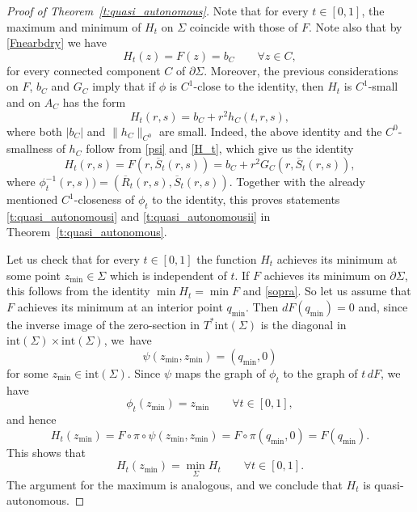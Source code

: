 \documentclass[10pt,a4paper]{article}
\theoremstyle{definition}
\begin{document}
\begin{proof}[Proof of Theorem~\ref{t:quasi_autonomous}]
Note that for every $t\in [0,1]$, the maximum and minimum of $H_t$ on $\Sigma$ coincide with those of $F$. Note also that by \eqref{Fnearbdry} we have
\begin{equation}
\label{sopra}
H_t(z) = F(z) = b_C \qquad \forall z\in C,
\end{equation}
for every connected component $C$ of $\partial \Sigma$. Moreover, the previous considerations on $F$, $b_C$ and $G_C$ imply that if $\phi$ is $C^1$-close to the identity, then $H_t$ is $C^1$-small and on $A_C$ has the form
\[
H_t(r,s) = b_C + r^2 h_C(t,r,s),
\]
where both $|b_C|$ and $\|h_C\|_{C^0}$ are small. Indeed, the above identity and the $C^0$-smallness of $h_C$ follow from \eqref{psi} and \eqref{H_t}, which give us the identity
\[
H_t(r,s) = F(r,\overline{S}_t(r,s)) = b_C + r^2 G_C(r,\overline{S}_t(r,s)),
\]
where $\phi_t^{-1}(r,s)) = ( \overline{R}_t(r,s),\overline{S}_t(r,s))$. Together with the already mentioned $C^1$\nobreakdash-close\-ness of $\phi_t$ to the identity, this proves statements \eqref{t:quasi_autonomousi} and \eqref{t:quasi_autonomousii} in Theorem~\ref{t:quasi_autonomous}.

Let us check that for every $t\in [0,1]$ the function $H_t$ achieves its minimum at some point $z_{\min}\in \Sigma$ which is independent of $t$. If $F$ achieves its minimum on $\partial \Sigma$, this follows from the identity $\min H_t = \min F$ and \eqref{sopra}. So let us assume that $F$ achieves its minimum at an interior point $q_{\min}$. Then $dF(q_{\min})=0$ and, since the inverse image of the zero-section in $T^* \mathrm{int}(\Sigma)$ is the diagonal in $\mathrm{int}(\Sigma) \times \mathrm{int}(\Sigma)$, we~have
\[
\psi(z_{\min},z_{\min}) = (q_{\min},0)
\]
for some $z_{\min} \in \mathrm{int}(\Sigma)$. Since $\psi$ maps the graph of $\phi_t$ to the graph of $t\, dF$, we have
\[
\phi_t(z_{\min}) = z_{\min} \qquad \forall t\in [0,1],
\]
and hence
\[
H_t(z_{\min}) = F \circ \pi \circ \psi(z_{\min},z_{\min}) = F \circ \pi (q_{\min},0) = F(q_{\min}).
\]
This shows that
\[
H_t(z_{\min}) = \min_{\Sigma} H_t \qquad \forall t\in [0,1].
\]
The argument for the maximum is analogous, and we conclude that $H_t$ is quasi-autonomous.
\end{proof}
\end{document}
